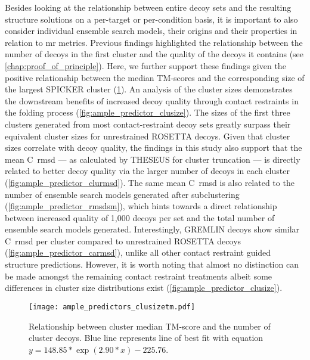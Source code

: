 Besides looking at the relationship between entire decoy sets and the resulting structure solutions on a per-target or per-condition basis, it is important to also consider individual ensemble search models, their origins and their properties in relation to \gls{mr} metrics. Previous findings highlighted the relationship between the number of decoys in the first cluster and the quality of the decoys it contains (see \cref{chap:proof_of_principle}). Here, we further support these findings given the positive relationship between the median TM-scores and the corresponding size of the largest SPICKER cluster (\cref{fig:ample_predictor_clusizetm}). An analysis of the cluster sizes demonstrates the downstream benefits of increased decoy quality through contact restraints in the folding process (\cref{fig:ample_predictor_clusize}). The sizes of the first three clusters generated from most contact-restraint decoy sets greatly surpass their equivalent cluster sizes for unrestrained ROSETTA decoys. Given that cluster sizes correlate with decoy quality, the findings in this study also support that the mean C\textalpha\ \gls{rmsd} --- as calculated by THESEUS for cluster truncation --- is directly related to better decoy quality via the larger number of decoys in each cluster (\cref{fig:ample_predictor_clurmsd}). The same mean C\textalpha\ \gls{rmsd} is also related to the number of ensemble search models generated after subclustering (\cref{fig:ample_predictor_rmsdsm}), which hints towards a direct relationship between increased quality of 1,000 decoys per set and the total number of ensemble search models generated. Interestingly, GREMLIN decoys show similar C\textalpha\ \gls{rmsd} per cluster compared to unrestrained ROSETTA decoys (\cref{fig:ample_predictor_carmsd}), unlike all other contact restraint guided structure predictions. However, it is worth noting that almost no distinction can be made amongst the remaining contact restraint treatments albeit some differences in cluster size distributions exist (\cref{fig:ample_predictor_clusize}).

\begin{figure}[H]
    \centering
    \texttt{[image: ample\_predictors\_clusizetm.pdf]}
    \caption[Relationship between median TM-score and decoy count in SPICKER cluster]{Relationship between cluster median TM-score and the number of cluster decoys. Blue line represents line of best fit with equation $y=148.85*\exp\left(2.90*x\right)-225.76$.}
    \label{fig:ample_predictor_clusizetm}
\end{figure}

